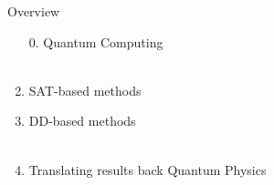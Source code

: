 \begin{frame}[noframenumbering]{Overview}


		\begin{enumerate}
			\item[0.] Quantum Computing \\~\\
			\item SAT-based methods
			\item DD-based methods
\\
~\\
			\item Translating results back Quantum Physics
		\end{enumerate}
\end{frame}


%
%
%
%
%
%
%
%
%
%
%
%
%
%	


